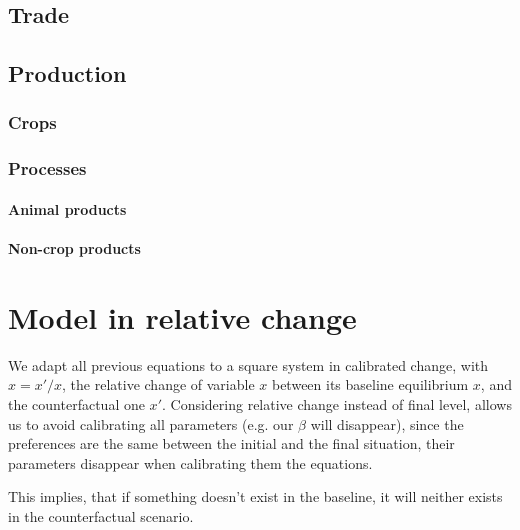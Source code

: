 \subsection{Trade}

\subsection{Production}

\subsubsection{Crops}

\subsubsection{Processes}

\paragraph{Animal products}

\paragraph{Non-crop products}


\section{Model in relative change}
We adapt all previous equations to a square system in calibrated change, with $\hat{x} = x'/x$, the relative change of variable $x$ between its baseline equilibrium $x$, and the counterfactual one $x'$. Considering relative change instead of final level, allows us to avoid calibrating all parameters (e.g. our $\beta$ will disappear), since the preferences are the same between the initial and the final situation, their parameters disappear when calibrating them the equations.

This implies, that if something doesn't exist in the baseline, it will neither exists in the counterfactual scenario.

